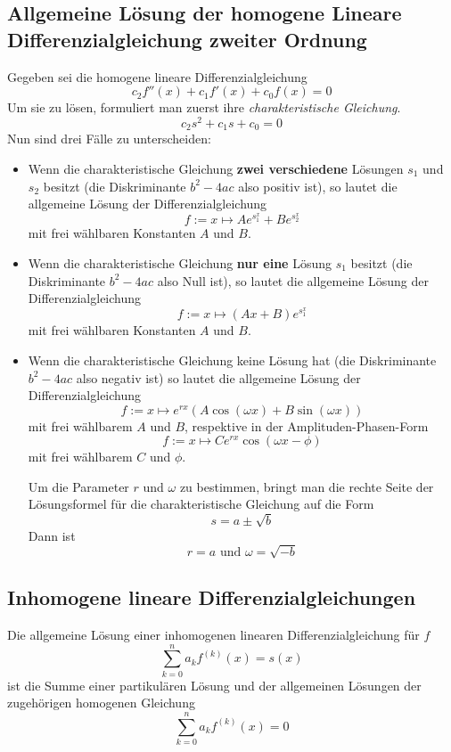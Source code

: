 \documentclass[10pt,a4paper]{scrartcl}
\begin{document}
\subsection{Allgemeine Lösung der homogene Lineare Differenzialgleichung
    zweiter Ordnung}

Gegeben sei die homogene lineare Differenzialgleichung
$$c_2f''(x) + c_1f'(x) + c_0f(x) = 0$$
Um sie zu lösen, formuliert man zuerst ihre \emph{charakteristische Gleichung}.
$$c_2s^2 + c_1s + c_0 = 0$$
Nun sind drei Fälle zu unterscheiden:

\begin{itemize}
    \item Wenn die charakteristische Gleichung \textbf{zwei verschiedene}
        Lösungen $s_1$ und $s_2$ besitzt (die Diskriminante $b^2 - 4ac$ also
        positiv ist), so lautet die allgemeine Lösung der Differenzialgleichung
        $$f := x \mapsto Ae^{s_1^x} + Be^{s_2^x}$$
        mit frei wählbaren Konstanten $A$ und $B$.
    \item Wenn die charakteristische Gleichung \textbf{nur eine} Lösung $s_1$
        besitzt (die Diskriminante $b^2 - 4ac$ also Null ist), so lautet die
        allgemeine Lösung der Differenzialgleichung
        $$f := x \mapsto (Ax + B)e^{s_1^x}$$
        mit frei wählbaren Konstanten $A$ und $B$.
    \item Wenn die charakteristische Gleichung keine Lösung hat (die
        Diskriminante $b^2 - 4ac$ also negativ ist) so lautet die allgemeine
        Lösung der Differenzialgleichung
        $$f := x \mapsto e^{rx}\left(A \cos(\omega x)
            + B \sin(\omega x)\right)$$
        mit frei wählbarem $A$ und $B$, respektive in der Amplituden-Phasen-Form
        $$f := x \mapsto Ce^{rx} \cos(\omega x - \phi)$$
        mit frei wählbarem $C$ und $\phi$.

        Um die Parameter $r$ und $\omega$ zu bestimmen, bringt man die rechte
        Seite der Lösungsformel für die charakteristische Gleichung auf die Form
        $$s = a \pm \sqrt{b}$$
        Dann ist
        $$r = a \textrm{ und } \omega = \sqrt{-b}$$
\end{itemize}


\subsection{Inhomogene lineare Differenzialgleichungen}

Die allgemeine Lösung einer inhomogenen linearen Differenzialgleichung für $f$
$$\sum_{k=0}^n a_k f^{(k)}(x) = s(x)$$
ist die Summe einer partikulären Lösung und der allgemeinen Lösungen der
zugehörigen homogenen Gleichung
$$\sum_{k=0}^n a_k f^{(k)}(x) = 0$$
\end{document}
